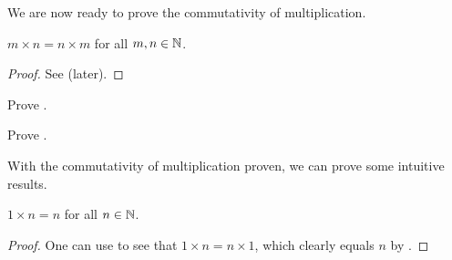 We are now ready to prove the commutativity of multiplication.

\begin{theorem}\label{theorem:multiplication-commutative-naturals}
    $m \times n = n \times m$ for all $m, n \in \mathbb{N}$.
\end{theorem}
\begin{proof}
    See  (later).
\end{proof}

\begin{exercise}\label{exercise:proof-of-commutativity}
    \begin{partquestions}{\roman*}
        \item Prove .
        \item Prove .
    \end{partquestions}
\end{exercise}

With the commutativity of multiplication proven, we can prove some intuitive results.

\begin{corollary}\label{corollary:multiplication-by-1}
    $1 \times n = n$ for all $n \in \mathbb{N}$.
\end{corollary}
\begin{proof}
    One can use  to see that $1 \times n = n \times 1$, which clearly equals $n$ by .
\end{proof}



